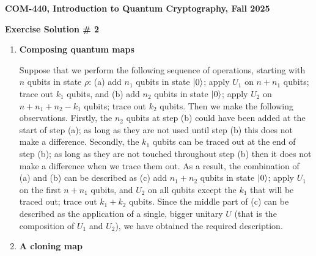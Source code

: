\documentclass[12pt]{article}
\newcommand{\header}[1]{\begin{center} {\large\bf #1} \end{center}}
\begin{document}
\header{COM-440, Introduction to Quantum Cryptography, Fall 2025}
\header{\bf Exercise Solution \# 2}


\begin{enumerate}

\item {\bf Composing quantum maps}

Suppose that we perform the following sequence of operations, starting with $n$ qubits in state $\rho$: (a) add $n_1$ qubits in state $\ket{0}$; apply $U_1$ on $n+n_1$ qubits; trace out $k_1$ qubits, and (b) add $n_2$ qubits in state $\ket{0}$; apply $U_2$ on $n+n_1+n_2-k_1$ qubits; trace out $k_2$ qubits. Then we make the following observations. Firstly, the $n_2$ qubits at step (b) could have been added at the start of step (a); as long as they are not used until step (b) this does not make a difference. Secondly, the $k_1$ qubits can be traced out at the end of step (b); as long as they are not touched throughout step (b) then it does not make a difference when we trace them out. As a result, the combination of (a) and (b) can be described as (c) add $n_1+n_2$ qubits in state $\ket{0}$; apply $U_1$ on the first $n+n_1$ qubits, and $U_2$ on all qubits except the $k_1$ that will be traced out; trace out $k_1+k_2$ qubits. Since the middle part of (c) can be described as the application of a single, bigger unitary $U$ (that is the composition of $U_1$ and $U_2$), we have obtained the required description. 

	
\item {\bf A cloning map}\label{ex:2-qmamp}


\end{enumerate}
\end{document}
